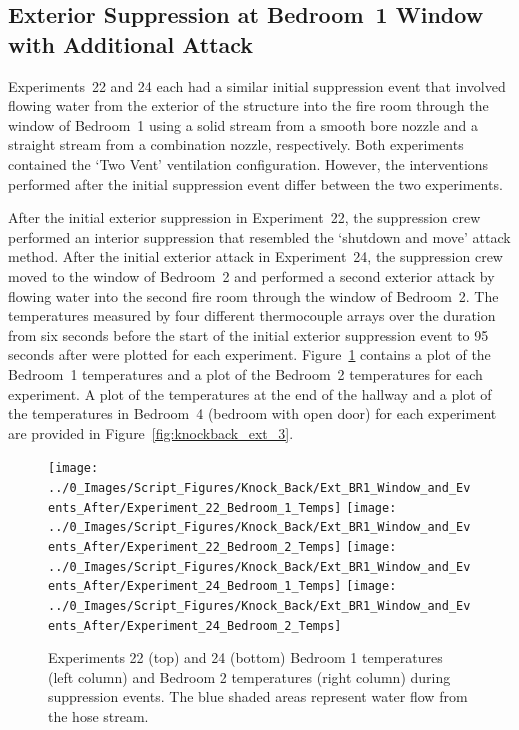 \documentclass[12pt,oneside]{book}
\begin{document}
\FloatBarrier

\subsection{Exterior Suppression at Bedroom~1 Window with Additional Attack}
Experiments~22 and 24 each had a similar initial suppression event that involved flowing water from the exterior of the structure into the fire room through the window of Bedroom~1 using a solid stream from a smooth bore nozzle and a straight stream from a combination nozzle, respectively. Both experiments contained the `Two Vent' ventilation configuration. However, the interventions performed after the initial suppression event differ between the two experiments. 

After the initial exterior suppression in Experiment~22, the suppression crew performed an interior suppression that resembled the `shutdown and move' attack method. After the initial exterior attack in Experiment~24, the suppression crew moved to the window of Bedroom~2 and performed a second exterior attack by flowing water into the second fire room through the window of Bedroom~2. The temperatures measured by four different thermocouple arrays over the duration from six seconds before the start of the initial exterior suppression event to 95 seconds after were plotted for each experiment. Figure~\ref{fig:knockback_ext_2} contains a plot of the Bedroom~1 temperatures and a plot of the Bedroom~2 temperatures for each experiment. A plot of the temperatures at the end of the hallway and a plot of the temperatures in Bedroom~4 (bedroom with open door) for each experiment are provided in Figure~\ref{fig:knockback_ext_3}.

\begin{figure}[!ht]
	\centering
	\texttt{[image: ../0\_Images/Script\_Figures/Knock\_Back/Ext\_BR1\_Window\_and\_Events\_After/Experiment\_22\_Bedroom\_1\_Temps]}
	\texttt{[image: ../0\_Images/Script\_Figures/Knock\_Back/Ext\_BR1\_Window\_and\_Events\_After/Experiment\_22\_Bedroom\_2\_Temps]}
	\texttt{[image: ../0\_Images/Script\_Figures/Knock\_Back/Ext\_BR1\_Window\_and\_Events\_After/Experiment\_24\_Bedroom\_1\_Temps]}
	\texttt{[image: ../0\_Images/Script\_Figures/Knock\_Back/Ext\_BR1\_Window\_and\_Events\_After/Experiment\_24\_Bedroom\_2\_Temps]}
	\caption[Exterior Attack with Additional Attack --- Bedrooms~1 \& 2 Temperatures]{Experiments 22 (top) and 24 (bottom) Bedroom 1 temperatures (left column) and Bedroom 2 temperatures (right column) during suppression events. The blue shaded areas represent water flow from the hose stream.}
	\label{fig:knockback_ext_2}
\end{figure}
\end{document}
